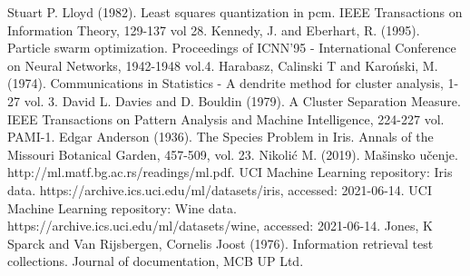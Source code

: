 \documentclass[a4paper,serbian]{symopissr}
\begin{document}
\begin{thebibliography}{99}

 Stuart P. Lloyd (1982). Least squares quantization in pcm.
    IEEE Transactions on Information Theory, 129-137 vol 28.
 Kennedy, J. and Eberhart, R. (1995). Particle swarm optimization. Proceedings of ICNN'95 - International Conference on Neural Networks, 1942-1948 vol.4.
 Harabasz, Calinski T and Karo{\'n}ski, M. (1974). Communications in Statistics - A dendrite method for cluster analysis, 1-27 vol. 3.  
 David L. Davies and D. Bouldin (1979). A Cluster Separation Measure. IEEE Transactions on Pattern Analysis and Machine Intelligence, 224-227 vol. PAMI-1.
 Edgar Anderson (1936). The Species Problem in Iris. Annals of the Missouri Botanical Garden, 457-509, vol. 23.
 Nikolić M. (2019). Mašinsko učenje.  
	http://ml.matf.bg.ac.rs/readings/ml.pdf.
 UCI Machine Learning repository: Iris data. https://archive.ics.uci.edu/ml/datasets/iris, accessed: 2021-06-14.
 UCI Machine Learning repository: Wine data. https://archive.ics.uci.edu/ml/datasets/wine, accessed: 2021-06-14.
 Jones, K Sparck and Van Rijsbergen, Cornelis Joost (1976). Information retrieval test collections. Journal of documentation, MCB UP Ltd.
\end{thebibliography}
\end{document}
